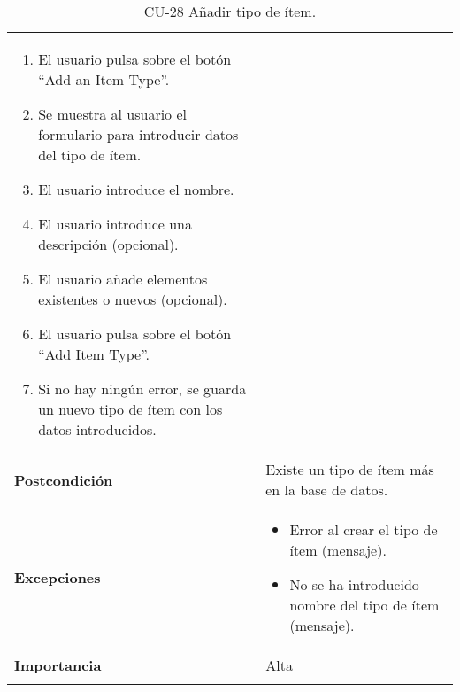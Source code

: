 \begin{longtable}[]{@{}ll@{}}
\begin{minipage}[t]{0.73\columnwidth}
\begin{enumerate}
\tightlist
\item
  El usuario pulsa sobre el botón ``Add an Item Type''.
\item
  Se muestra al usuario el formulario para introducir datos del tipo de
  ítem.
\item
  El usuario introduce el nombre.
\item
  El usuario introduce una descripción (opcional).
\item
  El usuario añade elementos existentes o nuevos (opcional).
\item
  El usuario pulsa sobre el botón ``Add Item Type''.
\item
  Si no hay ningún error, se guarda un nuevo tipo de ítem con los datos
  introducidos.
\end{enumerate}\strut
\end{minipage}\tabularnewline
\begin{minipage}[t]{0.21\columnwidth}\raggedright
\textbf{Postcondición}\strut
\end{minipage} & \begin{minipage}[t]{0.73\columnwidth}\raggedright
Existe un tipo de ítem más en la base de datos.\strut
\end{minipage}\tabularnewline
\begin{minipage}[t]{0.21\columnwidth}\raggedright
\textbf{Excepciones}\strut
\end{minipage} & \begin{minipage}[t]{0.73\columnwidth}\raggedright
\begin{itemize}
\tightlist
\item
  Error al crear el tipo de ítem (mensaje).
\item
  No se ha introducido nombre del tipo de ítem (mensaje).
\end{itemize}\strut
\end{minipage}\tabularnewline
\begin{minipage}[t]{0.21\columnwidth}\raggedright
\textbf{Importancia}\strut
\end{minipage} & \begin{minipage}[t]{0.73\columnwidth}\raggedright
Alta\strut
\end{minipage}\tabularnewline
\bottomrule
\caption{CU-28 Añadir tipo de ítem.}
\end{longtable}

